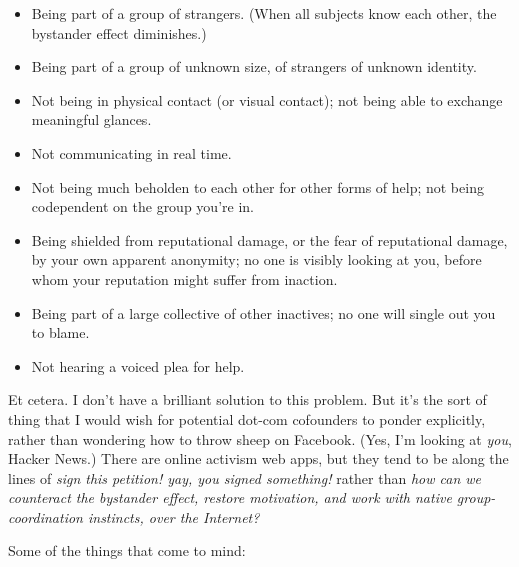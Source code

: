 \begin{itemize}
\item {
 Being part of a group of strangers. (When all subjects know each
other, the bystander effect diminishes.)}

\item {
 Being part of a group of unknown size, of strangers of unknown
identity.}

\item {
 Not being in physical contact (or visual contact); not being able
to exchange meaningful glances.}

\item {
 Not communicating in real time.}

\item {
 Not being much beholden to each other for other forms of help; not
being codependent on the group you're in.}

\item {
 Being shielded from reputational damage, or the fear of
reputational damage, by your own apparent anonymity; no one is visibly
looking at you, before whom your reputation might suffer from
inaction.}

\item {
 Being part of a large collective of other inactives; no one will
single out you to blame.}

\item {
  Not hearing a voiced plea for help.}
\end{itemize}

{
 Et cetera. I don't have a brilliant solution to
this problem. But it's the sort of thing that I would
wish for potential dot-com cofounders to ponder explicitly, rather than
wondering how to throw sheep on Facebook. (Yes, I'm
looking at \textit{you}, Hacker News.) There are online activism web
apps, but they tend to be along the lines of \textit{sign this
petition! yay, you signed something!} rather than \textit{how can we
counteract the bystander effect, restore motivation, and work with
native group-coordination instincts, over the Internet?}}

{
 Some of the things that come to mind:}

